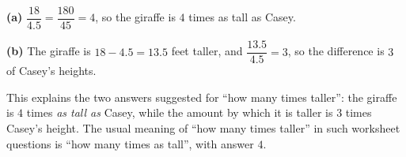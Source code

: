 \textbf{(a)} $\dfrac{18}{4.5}=\dfrac{180}{45}=4$, so the giraffe is $\boxed{4}$ times as tall as Casey.

\textbf{(b)} The giraffe is $18-4.5=\boxed{13.5}$ feet taller, and $\dfrac{13.5}{4.5}=3$, so the difference is $3$ of Casey's heights.

This explains the two answers suggested for ``how many times taller'': the giraffe is $4$ times \emph{as tall as} Casey, while the amount by which it is taller is $3$ times Casey's height. The usual meaning of ``how many times taller'' in such worksheet questions is ``how many times as tall'', with answer $4$.
